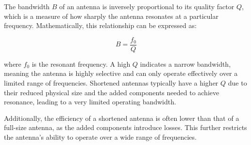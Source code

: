 The bandwidth \( B \) of an antenna is inversely proportional to its quality factor \( Q \), which is a measure of how sharply the antenna resonates at a particular frequency. Mathematically, this relationship can be expressed as:

\[
B = \frac{f_0}{Q}
\]

where \( f_0 \) is the resonant frequency. A high \( Q \) indicates a narrow bandwidth, meaning the antenna is highly selective and can only operate effectively over a limited range of frequencies. Shortened antennas typically have a higher \( Q \) due to their reduced physical size and the added components needed to achieve resonance, leading to a very limited operating bandwidth.

Additionally, the efficiency of a shortened antenna is often lower than that of a full-size antenna, as the added components introduce losses. This further restricts the antenna's ability to operate over a wide range of frequencies.

